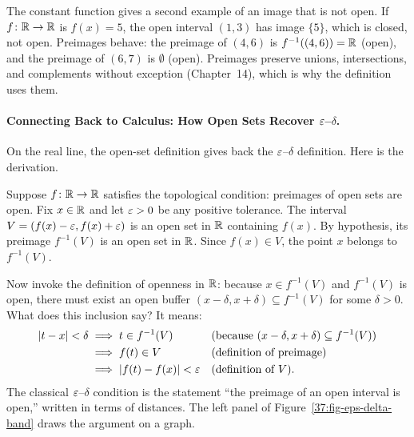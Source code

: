 The constant function gives a second example of an image that is not open. If $f\colon \mathbb{R} \to \mathbb{R}$ is $f(x) = 5$, the open interval $(1, 3)$ has image $\{5\}$, which is closed, not open. Preimages behave: the preimage of $(4, 6)$ is $f^{-1}((4, 6)) = \mathbb{R}$ (open), and the preimage of $(6, 7)$ is $\emptyset$ (open). Preimages preserve unions, intersections, and complements without exception (Chapter~14), which is why the definition uses them.

\paragraph{Connecting Back to Calculus: How Open Sets Recover $\varepsilon$--$\delta$.}
On the real line, the open-set definition gives back the $\varepsilon$--$\delta$ definition. Here is the derivation.

Suppose $f\colon \mathbb{R} \to \mathbb{R}$ satisfies the topological condition: preimages of open sets are open. Fix $x \in \mathbb{R}$ and let $\varepsilon > 0$ be any positive tolerance. The interval $V = (f(x) - \varepsilon, f(x) + \varepsilon)$ is an open set in $\mathbb{R}$ containing $f(x)$. By hypothesis, its preimage $f^{-1}(V)$ is an open set in $\mathbb{R}$. Since $f(x) \in V$, the point $x$ belongs to $f^{-1}(V)$.

Now invoke the definition of openness in $\mathbb{R}$: because $x \in f^{-1}(V)$ and $f^{-1}(V)$ is open, there must exist an open buffer $(x - \delta, x + \delta) \subseteq f^{-1}(V)$ for some $\delta > 0$. What does this inclusion say? It means:
\begin{align*}
|t - x| < \delta
  &\implies t \in f^{-1}(V) && \text{(because $(x - \delta, x + \delta) \subseteq f^{-1}(V)$)}\\
  &\implies f(t) \in V && \text{(definition of preimage)}\\
  &\implies |f(t) - f(x)| < \varepsilon && \text{(definition of $V$)}.
\end{align*}
The classical $\varepsilon$--$\delta$ condition is the statement ``the preimage of an open interval is open,'' written in terms of distances. The left panel of Figure~\ref{37:fig-eps-delta-band} draws the argument on a graph.

